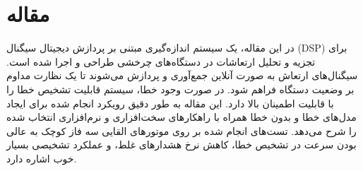 \documentclass[a4paper,10pt]{article}
\begin{document}

\section{مقاله \textcolor{blue}{\cite{article23}}}
در این مقاله، یک سیستم اندازه‌گیری مبتنی بر پردازش دیجیتال سیگنال (DSP) برای تجزیه و تحلیل ارتعاشات در دستگاه‌های چرخشی طراحی و اجرا شده است. سیگنال‌های ارتعاش به صورت آنلاین جمع‌آوری و پردازش می‌شوند تا یک نظارت مداوم بر وضعیت دستگاه فراهم شود. در صورت وجود خطا، سیستم قابلیت تشخیص خطا را با قابلیت اطمینان بالا دارد. این مقاله به طور دقیق رویکرد انجام شده برای ایجاد مدل‌های خطا و بدون خطا همراه با راهکارهای سخت‌افزاری و نرم‌افزاری انتخاب شده را شرح می‌دهد. تست‌های انجام شده بر روی موتورهای القایی سه فاز کوچک به عالی بودن سرعت در تشخیص خطا، کاهش نرخ هشدارهای غلط، و عملکرد تشخیصی بسیار خوب اشاره دارد.












	
	
	
	
	
	\newpage
	
	\begin{latin}
		
		
	\end{latin}
	
\end{document}
